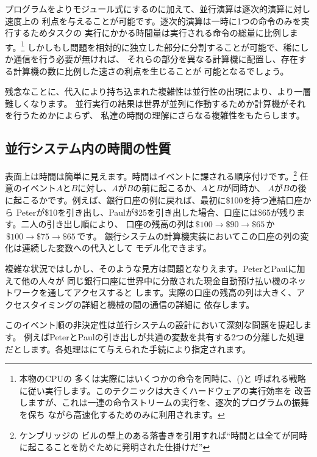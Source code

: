 プログラムをよりモジュール式にするのに加えて、並行演算は逐次的演算に対し速度上の
利点を与えることが可能です。逐次的演算は一時に1つの命令のみを実行するためタスクの
実行にかかる時間量は実行される命令の総量に比例します。\footnote{本物のCPUの
多くは実際にはいくつかの命令を同時に、()と
呼ばれる戦略に従い実行します。このテクニックは大きくハードウェアの実行効率を
改善しますが、これは一連の命令ストリームの実行を、逐次的プログラムの振舞を保ち
ながら高速化するためのみに利用されます。}
しかしもし問題を相対的に独立した部分に分割することが可能で、稀にしか通信を行う必要が無ければ、
それらの部分を異なる計算機に配置し、存在する計算機の数に比例した速さの利点を生じることが
可能となるでしょう。



残念なことに、代入により持ち込まれた複雑性は並行性の出現により、より一層難しくなります。
並行実行の結果は世界が並列に作動するためか計算機がそれを行うためかによらず、
私達の時間の理解にさらなる複雑性をもたらします。



\subsection{並行システム内の時間の性質}
\label{Section 3.4.1}



表面上は時間は簡単に見えます。時間はイベントに課される順序付けです。\footnote{ケンブリッジの
ビルの壁上のある落書きを引用すれば``時間とは全てが同時に起こることを防ぐために発明された仕掛けだ''}
任意のイベント\( A \)と\( B \)に対し、\( A \)が\( B \)の前に起こるか、\( A \)と\( B \)が同時か、
\( A \)が\( B \)の後に起こるかです。例えば、銀行口座の例に戻れば、最初に\$100を持つ連結口座から
Peterが\$10を引き出し、Paulが\$25を引き出した場合、口座には\$65が残ります。二人の引き出し順により、
口座の残高の列は\( \,\$100 \to \$90 \to \$65\, \)か\( \,\$100 \to \$75 \to \$65\, \)です。
銀行システムの計算機実装においてこの口座の列の変化は連続した変数への代入として
モデル化できます。


複雑な状況ではしかし、そのような見方は問題となりえます。PeterとPaulに加えて他の人々が
同じ銀行口座に世界中に分散された現金自動預け払い機のネットワークを通してアクセスすると
します。実際の口座の残高の列は大きく、アクセスタイミングの詳細と機械の間の通信の詳細に
依存します。


このイベント順の非決定性は並行システムの設計において深刻な問題を提起します。
例えばPeterとPaulの引き出しが共通の変数を共有する2つの分離した処理
だとします。各処理はにて与えられた手続により指定されます。

